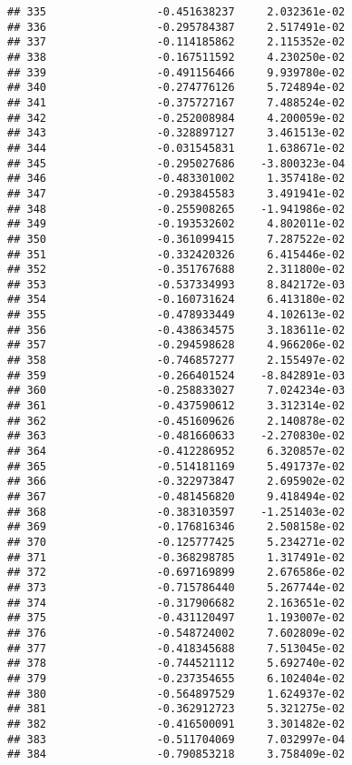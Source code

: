 \documentclass[
]{article}
\begin{document}
\begin{verbatim}
## 335                 -0.451638237     2.032361e-02
## 336                 -0.295784387     2.517491e-02
## 337                 -0.114185862     2.115352e-02
## 338                 -0.167511592     4.230250e-02
## 339                 -0.491156466     9.939780e-02
## 340                 -0.274776126     5.724894e-02
## 341                 -0.375727167     7.488524e-02
## 342                 -0.252008984     4.200059e-02
## 343                 -0.328897127     3.461513e-02
## 344                 -0.031545831     1.638671e-02
## 345                 -0.295027686    -3.800323e-04
## 346                 -0.483301002     1.357418e-02
## 347                 -0.293845583     3.491941e-02
## 348                 -0.255908265    -1.941986e-02
## 349                 -0.193532602     4.802011e-02
## 350                 -0.361099415     7.287522e-02
## 351                 -0.332420326     6.415446e-02
## 352                 -0.351767688     2.311800e-02
## 353                 -0.537334993     8.842172e-03
## 354                 -0.160731624     6.413180e-02
## 355                 -0.478933449     4.102613e-02
## 356                 -0.438634575     3.183611e-02
## 357                 -0.294598628     4.966206e-02
## 358                 -0.746857277     2.155497e-02
## 359                 -0.266401524    -8.842891e-03
## 360                 -0.258833027     7.024234e-03
## 361                 -0.437590612     3.312314e-02
## 362                 -0.451609626     2.140878e-02
## 363                 -0.481660633    -2.270830e-02
## 364                 -0.412286952     6.320857e-02
## 365                 -0.514181169     5.491737e-02
## 366                 -0.322973847     2.695902e-02
## 367                 -0.481456820     9.418494e-02
## 368                 -0.383103597    -1.251403e-02
## 369                 -0.176816346     2.508158e-02
## 370                 -0.125777425     5.234271e-02
## 371                 -0.368298785     1.317491e-02
## 372                 -0.697169899     2.676586e-02
## 373                 -0.715786440     5.267744e-02
## 374                 -0.317906682     2.163651e-02
## 375                 -0.431120497     1.193007e-02
## 376                 -0.548724002     7.602809e-02
## 377                 -0.418345688     7.513045e-02
## 378                 -0.744521112     5.692740e-02
## 379                 -0.237354655     6.102404e-02
## 380                 -0.564897529     1.624937e-02
## 381                 -0.362912723     5.321275e-02
## 382                 -0.416500091     3.301482e-02
## 383                 -0.511704069     7.032997e-04
## 384                 -0.790853218     3.758409e-02

\end{verbatim}
\end{document}
